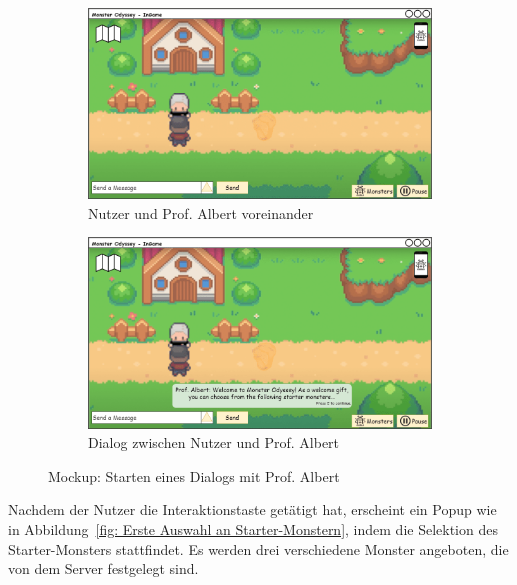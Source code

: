 \begin{figure}[H]
    \centering
    \begin{subfigure}[b]{0.4\textwidth}
        \includegraphics[width=\textwidth]{images/mockups/Starter/PlayerAndProf}
        \caption{Nutzer und Prof. Albert voreinander}
        \label{fig: User and Prof. Albert voreinander}
    \end{subfigure}
    \hfill
    \begin{subfigure}[b]{0.4\textwidth}
        \includegraphics[width=\textwidth]{images/mockups/Starter/PlayerAndProfMessage}
        \caption{Dialog zwischen Nutzer und Prof. Albert}
        \label{fig: Dialog Nutzer und Prof. Albert}
    \end{subfigure}
    \caption{Mockup: Starten eines Dialogs mit Prof. Albert}
    \label{fig: Starten eines Dialogs mit Prof. Albert}
\end{figure}
Nachdem der Nutzer die Interaktionstaste getätigt hat, erscheint ein Popup wie in Abbildung~\ref{fig: Erste Auswahl an Starter-Monstern}, indem die Selektion des Starter-Monsters stattfindet.
Es werden drei verschiedene Monster angeboten, die von dem Server festgelegt sind.
